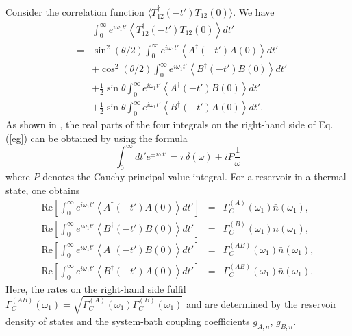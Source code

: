 \documentclass[12pt]{iopart}
\begin{document}
Consider the correlation function $\langle T_{12}^{\dag}(-t')T_{12}(0)\rangle$. We have
\begin{eqnarray}\label{eg}
&&\int_{0}^{\infty}e^{i\omega_{1}t'}\left\langle T_{12}^{\dag}(-t')T_{12}(0)\right\rangle dt'\nonumber\\
&=&\sin^{2}(\theta/2)\int_{0}^{\infty}e^{i\omega_{1}t'}\left\langle A^{\dag}(-t')A(0)\right\rangle dt'\nonumber\\
&&+\cos^{2}(\theta/2)\int_{0}^{\infty}e^{i\omega_{1}t'}\left\langle B^{\dag}(-t')B(0)\right\rangle dt'\nonumber\\
&&+\frac{1}{2}\sin\theta \int_{0}^{\infty}e^{i\omega_{1}t'}\left\langle A^{\dag}(-t')B(0)\right\rangle dt'\nonumber\\
&&+\frac{1}{2}\sin\theta \int_{0}^{\infty}e^{i\omega_{1}t'}\left\langle B^{\dag}(-t')A(0)\right\rangle dt'.
\end{eqnarray}
As shown in \cite{equi7}, the real parts of the four integrals on the right-hand side of Eq. (\ref{eg}) can be obtained by using the formula
\begin{equation}\label{ff}
\int_{0}^{\infty}dt'e^{\pm i\omega t'}=\pi\delta(\omega)\pm iP\frac{1}{\omega}
\end{equation}
where $P$ denotes the Cauchy principal value integral. For a reservoir in a thermal state, one obtains
\begin{eqnarray}
\textrm{Re} \left[ \int_{0}^{\infty}e^{i\omega_{1}t'}\left\langle A^{\dag}(-t')A(0)\right\rangle dt' \right] & = & \Gamma_C^{(A)}(\omega_1) \bar{n}(\omega_1) , \nonumber \\
\textrm{Re} \left[ \int_{0}^{\infty}e^{i\omega_{1}t'}\left\langle B^{\dag}(-t')B(0)\right\rangle dt' \right] & = & \Gamma_C^{(B)}(\omega_1) \bar{n}(\omega_1) , \nonumber \\
\textrm{Re} \left[ \int_{0}^{\infty}e^{i\omega_{1}t'}\left\langle A^{\dag}(-t')B(0)\right\rangle dt' \right] & = & \Gamma_{C}^{(AB)}(\omega_1) \bar{n}(\omega_1) , \nonumber \\
\textrm{Re} \left[ \int_{0}^{\infty}e^{i\omega_{1}t'}\left\langle B^{\dag}(-t')A(0)\right\rangle dt' \right] & = & \Gamma_{C}^{(AB)}(\omega_1) \bar{n}(\omega_1)  .
\end{eqnarray}
Here, the rates on the right-hand side fulfil $\Gamma_{C}^{(AB)}(\omega_1) = \sqrt{\Gamma_C^{(A)}(\omega_1) \Gamma_C^{(B)}(\omega_1)}$ and are determined by the reservoir density of states and the system-bath coupling coefficients $g_{A,n}$, $g_{B,n}$.
\end{document}
